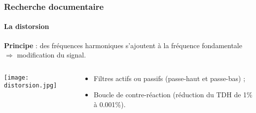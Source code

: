 \documentclass[pdf]{beamer}
\begin{document}
\begin{frame}
	\frametitle{Recherche documentaire}
	\framesubtitle{La distorsion}
	
	\textbf{Principe} : des fréquences harmoniques s'ajoutent à la fréquence fondamentale
	$\Rightarrow$ modification du signal.
	
	\bigbreak
	
	\begin{columns}
		\begin{column}{5cm}
			\texttt{[image: distorsion.jpg]}
		\end{column}
		
		\begin{column}{5cm}
			\begin{itemize}
				\item	Filtres actifs ou passifs (passe-haut et passe-bas) ;
				\item Boucle de contre-réaction (réduction du TDH de 1\% à 0.001\%).
			\end{itemize}
		\end{column}
	\end{columns}

\end{frame}
\end{document}
